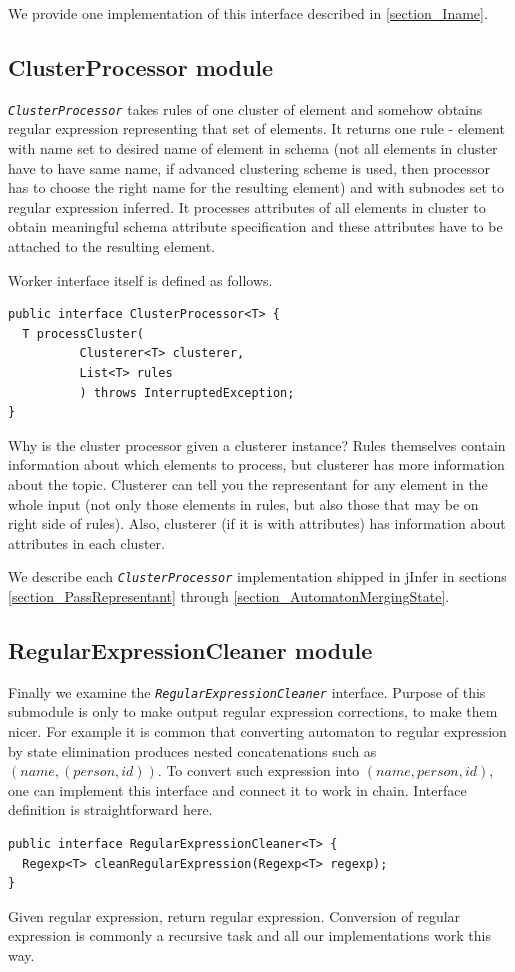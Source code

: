 \documentclass[a4paper,10pt,oneside]{article}
\newcommand{\jmodule}[1]{\texttt{\textit{#1}}}
\begin{document}
We provide one implementation of this interface described in \ref{section_Iname}.

\subsection{ClusterProcessor module}
\jmodule{ClusterProcessor} takes rules of one cluster of element and somehow obtains regular expression representing that set of elements. It returns one rule - element with name set to desired name of element in schema (not all elements in cluster have to have same name, if advanced clustering scheme is used, then processor has to choose the right name for the resulting element) and with subnodes set to regular expression inferred.
It processes attributes of all elements in cluster to obtain meaningful schema attribute specification and these attributes have to be attached to the resulting element.

Worker interface itself is defined as follows.
\begin{verbatim}
public interface ClusterProcessor<T> {
  T processCluster(
          Clusterer<T> clusterer,
          List<T> rules
          ) throws InterruptedException;
}
\end{verbatim}
Why is the cluster processor given a clusterer instance?
Rules themselves contain information about which elements to process, but clusterer has more information about the topic.
Clusterer can tell you the representant for any element in the whole input (not only those elements in rules, but also those that may be on right side of rules). Also, clusterer (if it is with attributes) has information about attributes in each cluster.

We describe each \jmodule{ClusterProcessor} implementation shipped in jInfer in sections \ref{section_PassRepresentant} through \ref{section_AutomatonMergingState}.

\subsection{RegularExpressionCleaner module}
Finally we examine the \jmodule{RegularExpressionCleaner} interface.
Purpose of this submodule is only to make output regular expression corrections, to make them nicer.
For example it is common that converting automaton to regular expression by state elimination produces nested concatenations such as $(name, (person, id))$.
To convert such expression into $(name, person, id)$, one can implement this interface and connect it to work in chain.
Interface definition is straightforward here.
\begin{verbatim}
public interface RegularExpressionCleaner<T> {
  Regexp<T> cleanRegularExpression(Regexp<T> regexp);
}
\end{verbatim}
Given regular expression, return regular expression.
Conversion of regular expression is commonly a recursive task and all our implementations work this way.
\end{document}
